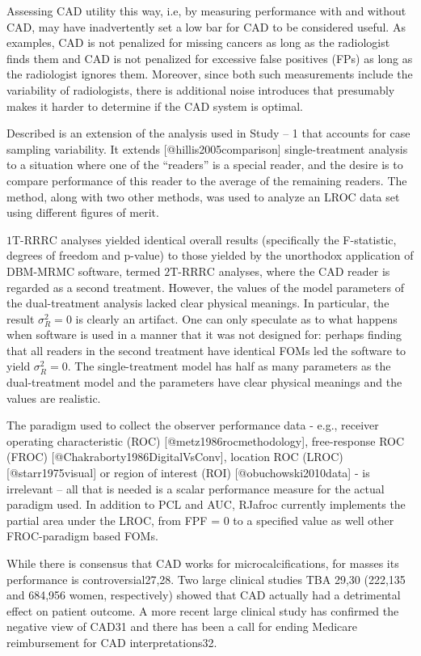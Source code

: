 \documentclass[
]{article}
\begin{document}
Assessing CAD utility this way, i.e, by measuring performance with and without CAD, may have inadvertently set a low bar for CAD to be considered useful. As examples, CAD is not penalized for missing cancers as long as the radiologist finds them and CAD is not penalized for excessive false positives (FPs) as long as the radiologist ignores them. Moreover, since both such measurements include the variability of radiologists, there is additional noise introduces that presumably makes it harder to determine if the CAD system is optimal.

Described is an extension of the analysis used in Study -- 1 that accounts for case sampling variability. It extends {[}@hillis2005comparison{]} single-treatment analysis to a situation where one of the ``readers'' is a special reader, and the desire is to compare performance of this reader to the average of the remaining readers. The method, along with two other methods, was used to analyze an LROC data set using different figures of merit.

\(\text{1T-RRRC}\) analyses yielded identical overall results (specifically the F-statistic, degrees of freedom and p-value) to those yielded by the unorthodox application of DBM-MRMC software, termed \(\text{2T-RRRC}\) analyses, where the CAD reader is regarded as a second treatment. However, the values of the model parameters of the dual-treatment analysis lacked clear physical meanings. In particular, the result \(\sigma_R^2 = 0\) is clearly an artifact. One can only speculate as to what happens when software is used in a manner that it was not designed for: perhaps finding that all readers in the second treatment have identical FOMs led the software to yield \(\sigma_R^2 = 0\). The single-treatment model has half as many parameters as the dual-treatment model and the parameters have clear physical meanings and the values are realistic.

The paradigm used to collect the observer performance data - e.g., receiver operating characteristic (ROC) {[}@metz1986rocmethodology{]}, free-response ROC (FROC) {[}@Chakraborty1986DigitalVsConv{]}, location ROC (LROC) {[}@starr1975visual{]} or region of interest (ROI) {[}@obuchowski2010data{]} - is irrelevant -- all that is needed is a scalar performance measure for the actual paradigm used. In addition to PCL and AUC, RJafroc currently implements the partial area under the LROC, from FPF = 0 to a specified value as well other FROC-paradigm based FOMs.

While there is consensus that CAD works for microcalcifications, for masses its performance is controversial27,28. Two large clinical studies TBA 29,30 (222,135 and 684,956 women, respectively) showed that CAD actually had a detrimental effect on patient outcome. A more recent large clinical study has confirmed the negative view of CAD31 and there has been a call for ending Medicare reimbursement for CAD interpretations32.
\end{document}
